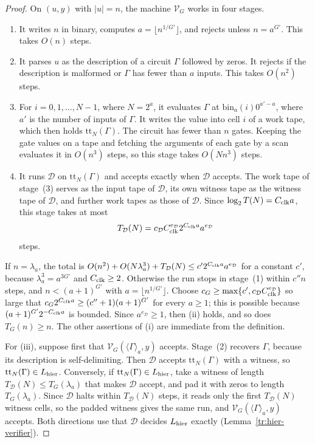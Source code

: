 \documentclass[11pt,letterpaper]{article}
\theoremstyle{definition}
\theoremstyle{remark}
\begin{document}
\begin{proof}
On $(u,y)$ with $|u|=n$, the machine $\mathcal V_G$ works in four
stages.
\begin{enumerate}[label=(\arabic*)]
\item It writes $n$ in binary, computes $a=\lfloor n^{1/G'}\rfloor$, and
rejects unless $n=a^{G'}$. This takes $O(n)$ steps.

\item It parses $u$ as the description of a circuit $\Gamma$ followed by
zeros. It rejects if the description is malformed or $\Gamma$ has
fewer than $a$ inputs. This takes $O(n^2)$ steps.

\item For $i=0,1,\ldots,N-1$, where $N=2^a$, it evaluates $\Gamma$ at
$\mathrm{bin}_a(i)0^{a'-a}$, where $a'$ is the number of inputs of
$\Gamma$. It writes the value into cell $i$ of a work tape, which then
holds $\mathrm{tt}_N(\Gamma)$. The circuit has fewer than $n$ gates.
Keeping the gate values on a tape and fetching the arguments of each
gate by a scan evaluates it in $O(n^3)$ steps, so this stage takes
$O(Nn^3)$ steps.

\item It runs $\mathcal D$ on $\mathrm{tt}_N(\Gamma)$ and accepts exactly
when $\mathcal D$ accepts. The work tape of stage~(3) serves as the
input tape of $\mathcal D$, its own witness tape as the witness tape of
$\mathcal D$, and further work tapes as those of $\mathcal D$. Since
$\log_2T(N)=C_{\rm clk}a$, this stage takes at most
\[
 T_{\mathcal D}(N)=c_{\mathcal D}C_{\rm clk}^{e_{\mathcal D}}
 2^{C_{\rm clk}a}a^{e_{\mathcal D}}
\]
steps.
\end{enumerate}

If $n=\lambda_a$, the total is
$O(n^2)+O(N\lambda_a^3)+T_{\mathcal D}(N)\le
c'2^{C_{\rm clk}a}a^{e_{\mathcal D}}$ for a
constant $c'$, because $\lambda_a^3=a^{3G'}$ and $C_{\rm clk}\ge2$.
Otherwise the run stops in stage~(1) within $c''n$ steps, and
$n<(a+1)^{G'}$ with $a=\lfloor n^{1/G'}\rfloor$. Choose
$c_G\ge\max\{c',c_{\mathcal D}C_{\rm clk}^{e_{\mathcal D}}\}$ so large that
$c_G2^{C_{\rm clk}a}\ge(c''+1)(a+1)^{G'}$ for every $a\ge1$; this is
possible because $(a+1)^{G'}2^{-C_{\rm clk}a}$ is bounded. Since
$a^{e_{\mathcal D}}\ge1$, then (ii)
holds, and so does $T_G(n)\ge n$. The other assertions of (i) are
immediate from the definition.

For (iii), suppose first that $\mathcal V_G(\langle\Gamma\rangle_a,y)$
accepts. Stage~(2) recovers $\Gamma$, because its description is
self-delimiting. Then $\mathcal D$ accepts $\mathrm{tt}_N(\Gamma)$ with
a witness, so $\mathrm{tt}_N(\Gamma)\in L_{\rm hier}$. Conversely, if
$\mathrm{tt}_N(\Gamma)\in L_{\rm hier}$, take a witness of length
$T_{\mathcal D}(N)\le T_G(\lambda_a)$ that makes $\mathcal D$ accept,
and pad it with zeros to length $T_G(\lambda_a)$. Since $\mathcal D$
halts within $T_{\mathcal D}(N)$ steps, it reads only the first
$T_{\mathcal D}(N)$ witness cells, so the padded witness gives the
same run, and $\mathcal V_G(\langle\Gamma\rangle_a,y)$ accepts. Both
directions use that $\mathcal D$ decides $L_{\rm hier}$ exactly
(Lemma~\ref{tr:hier-verifier}).
\end{proof}
\end{document}
